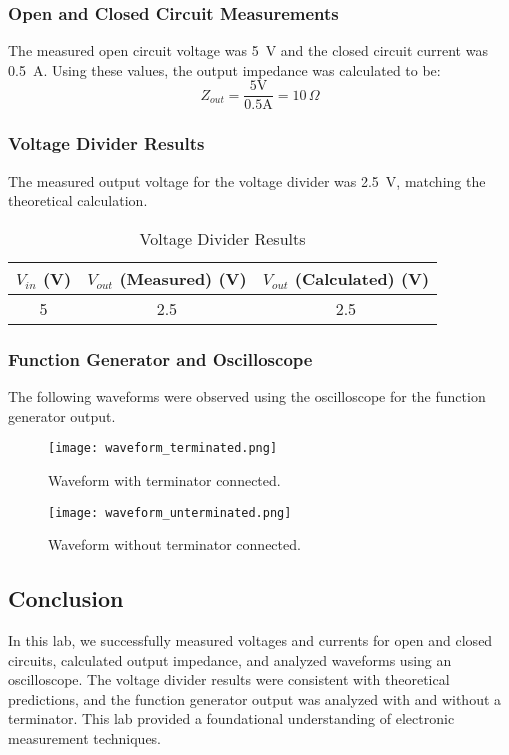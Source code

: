 \documentclass{article}
\begin{document}

\subsubsection{Open and Closed Circuit Measurements}
The measured open circuit voltage was \SI{5}{V} and the closed circuit current was \SI{0.5}{A}. Using these values, the output impedance was calculated to be:
\[
Z_{out} = \frac{5 \text{V}}{0.5 \text{A}} = 10 \, \Omega
\]

\subsubsection{Voltage Divider Results}
The measured output voltage for the voltage divider was \SI{2.5}{V}, matching the theoretical calculation.

\begin{table}[H]
\centering
\caption{Voltage Divider Results}
\begin{tabular}{|c|c|c|}
\hline
$V_{in}$ (V) & $V_{out}$ (Measured) (V) & $V_{out}$ (Calculated) (V) \\ \hline
5            & 2.5                      & 2.5                        \\ \hline
\end{tabular}
\end{table}

\subsubsection{Function Generator and Oscilloscope}
The following waveforms were observed using the oscilloscope for the function generator output.

\begin{figure}[H]
    \centering
    \texttt{[image: waveform\_terminated.png]}  %
    \caption{Waveform with terminator connected.}
    \label{fig:terminated_waveform}
\end{figure}

\begin{figure}[H]
    \centering
    \texttt{[image: waveform\_unterminated.png]}  %
    \caption{Waveform without terminator connected.}
    \label{fig:unterminated_waveform}
\end{figure}

\subsection{Conclusion}
In this lab, we successfully measured voltages and currents for open and closed circuits, calculated output impedance, and analyzed waveforms using an oscilloscope. The voltage divider results were consistent with theoretical predictions, and the function generator output was analyzed with and without a terminator. This lab provided a foundational understanding of electronic measurement techniques.
\end{document}
